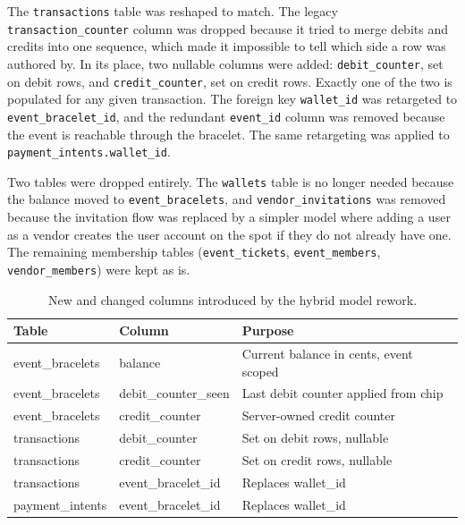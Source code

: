The \texttt{transactions} table was reshaped to match. The legacy \texttt{transaction\_counter} column was dropped because it tried to merge debits and credits into one sequence, which made it impossible to tell which side a row was authored by. In its place, two nullable columns were added: \texttt{debit\_counter}, set on debit rows, and \texttt{credit\_counter}, set on credit rows. Exactly one of the two is populated for any given transaction. The foreign key \texttt{wallet\_id} was retargeted to \texttt{event\_bracelet\_id}, and the redundant \texttt{event\_id} column was removed because the event is reachable through the bracelet. The same retargeting was applied to \texttt{payment\_intents.wallet\_id}.

Two tables were dropped entirely. The \texttt{wallets} table is no longer needed because the balance moved to \texttt{event\_bracelets}, and \texttt{vendor\_invitations} was removed because the invitation flow was replaced by a simpler model where adding a user as a vendor creates the user account on the spot if they do not already have one. The remaining membership tables (\texttt{event\_tickets}, \texttt{event\_members}, \texttt{vendor\_members}) were kept as is.

\begin{table}[ht]
	\centering
	\begin{tabular}{|l|l|l|}
		\hline
		\textbf{Table} & \textbf{Column} & \textbf{Purpose} \\
		\hline
		event\_bracelets & balance & Current balance in cents, event scoped \\
		\hline
		event\_bracelets & debit\_counter\_seen & Last debit counter applied from chip \\
		\hline
		event\_bracelets & credit\_counter & Server-owned credit counter \\
		\hline
		transactions & debit\_counter & Set on debit rows, nullable \\
		\hline
		transactions & credit\_counter & Set on credit rows, nullable \\
		\hline
		transactions & event\_bracelet\_id & Replaces wallet\_id \\
		\hline
		payment\_intents & event\_bracelet\_id & Replaces wallet\_id \\
		\hline
	\end{tabular}
	\caption{New and changed columns introduced by the hybrid model rework.}
	\label{tab:schema-changes}
\end{table}

